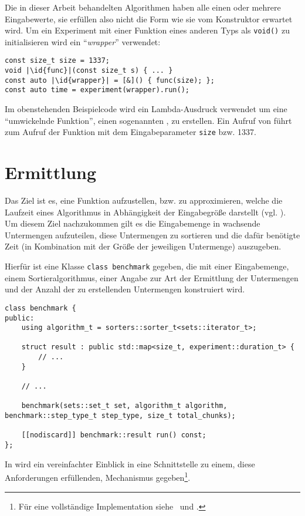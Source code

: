 Die in dieser Arbeit behandelten Algorithmen haben alle einen oder mehrere Eingabewerte, sie erfüllen also nicht die Form wie sie vom Konstruktor erwartet wird. Um ein Experiment mit einer Funktion eines anderen Typs als \lstinline{void()} zu initialisieren wird ein \enquote{\emph{wrapper}} verwendet:

\begin{lstlisting}[numbers=none]
const size_t size = 1337;
void |\id{func}|(const size_t s) { ... }
const auto |\id{wrapper}| = [&]() { func(size); };
const auto time = experiment(wrapper).run();
\end{lstlisting}

Im obenstehenden Beispielcode wird ein Lambda-Ausdruck verwendet um eine \enquote{umwickelnde Funktion}, einen sogenannten , zu erstellen. Ein Aufruf von  führt zum Aufruf der Funktion  mit dem Eingabeparameter \lstinline{size} bzw. 1337.

\section{Ermittlung}
\label{sec:funkterm}

Das Ziel ist es, eine Funktion aufzustellen, bzw. zu approximieren, welche die Laufzeit eines Algorithmus in Abhängigkeit der Eingabegröße darstellt (vgl. \cite[37]{mcg2012}). Um diesem Ziel nachzukommen gilt es die Eingabemenge in wachsende Untermengen aufzuteilen, diese Untermengen zu sortieren und die dafür benötigte Zeit (in Kombination mit der Größe der jeweiligen Untermenge) auszugeben.

Hierfür ist eine Klasse \lstinline{class benchmark} gegeben, die mit einer Eingabemenge, einem Sortieralgorithmus, einer Angabe zur Art der Ermittlung der Untermengen und der Anzahl der zu erstellenden Untermengen konstruiert wird.

\begin{lstlisting}[caption={Klasse zur Approximation einer Funktion der Laufzeit eines Algorithmus in Abhängigkeit der Eingabegröße.}, label=lst:simple-benchmark]
class benchmark {
public:
	using algorithm_t = sorters::sorter_t<sets::iterator_t>;

	struct result : public std::map<size_t, experiment::duration_t> {
	    // ...
	}

	// ...

	benchmark(sets::set_t set, algorithm_t algorithm, benchmark::step_type_t step_type, size_t total_chunks);

	[[nodiscard]] benchmark::result run() const;
};
\end{lstlisting}
\noindent
In  wird ein vereinfachter Einblick in eine Schnittstelle zu einem, diese Anforderungen erfüllenden, Mechanismus gegeben\footnote{Für eine vollständige Implementation siehe \crBenchmark~und \crBenchmarkImpl.}.

